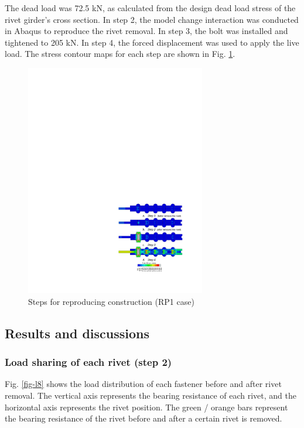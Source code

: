 The dead load was 72.5 kN, as calculated from the design dead load stress of the rivet girder’s cross section. In step 2, the model change interaction was conducted in Abaqus to reproduce the rivet removal. In step 3, the bolt was installed and tightened to 205 kN. In step 4, the forced displacement was used to apply the live load. The stress contour maps for each step are shown in Fig. \ref{fig-l7}.


\begin{figure}[htbp]
    \centering
    \includegraphics[width=0.7\textwidth]{imgs/ch4/fig-l7.pdf}
    \caption{Steps for reproducing construction (RP1 case)}
    \label{fig-l7}
\end{figure}

\subsection{Results and discussions}

\subsubsection{Load sharing of each rivet (step 2)}

Fig. \ref{fig-l8} shows the load distribution of each fastener before and after rivet removal. The vertical axis represents the bearing resistance of each rivet, and the horizontal axis represents the rivet position. The green / orange bars represent the bearing resistance of the rivet before and after a
certain rivet is removed.


